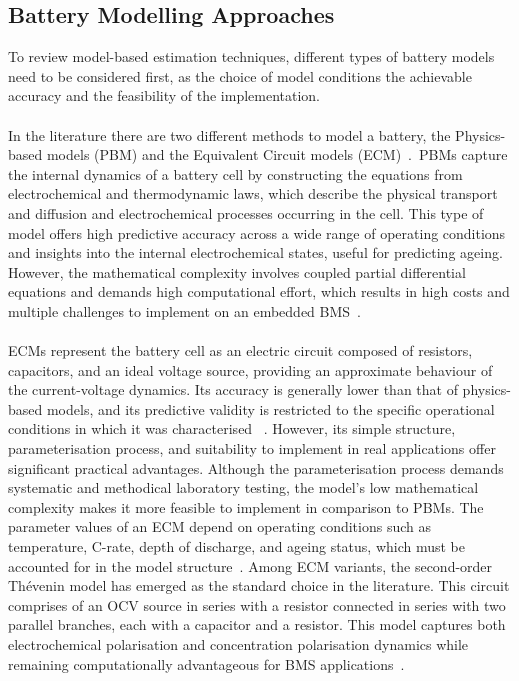 \subsection{Battery Modelling Approaches}\label{SoABatteryModels}

To review model-based estimation techniques, different types of battery models need to be considered first, 
as the choice of model conditions the achievable accuracy and the feasibility of the implementation.
\\
\\
In the literature there are two different methods to model a battery, the Physics-based models (\acs{PBM}) and the Equivalent 
Circuit models (\acs{ECM})~\cite{plett2015battery}.~\acsp{PBM} capture the internal dynamics of a battery cell by constructing the 
equations from electrochemical and thermodynamic laws, which describe the physical transport and diffusion and 
electrochemical processes occurring in the cell. This type of model offers high predictive accuracy across a wide 
range of operating conditions and insights into the internal electrochemical states, useful for predicting ageing. 
However, the mathematical complexity involves coupled partial differential equations and demands high computational
effort, which results in high costs and multiple challenges to implement on an embedded \acs{BMS}~\cite{plett2015battery}.
\\
\\
\acsp{ECM} represent the battery cell as an electric circuit composed of resistors, capacitors, and an ideal voltage source, providing
an approximate behaviour of the current-voltage dynamics. Its accuracy is generally lower than that of physics-based models, 
and its predictive validity is restricted to the specific operational conditions in which it was characterised~\cite{plett2015battery}
\cite{SOHBook}.
However, its simple structure, parameterisation process, and suitability to implement in real applications offer significant 
practical advantages. Although the parameterisation process demands systematic and methodical laboratory testing, 
the model's low mathematical complexity makes it more feasible to implement in comparison to \acsp{PBM}.
The parameter values of an \acs{ECM} depend on operating conditions such as temperature, C-rate, depth of discharge, 
and ageing status, which must be accounted for in the model structure~\cite{DEVARAKONDA2014}. Among \acs{ECM} variants, the second-order 
Thévenin model has emerged as the standard choice in the literature. This circuit comprises of an \acs{OCV} source in series with a 
resistor connected in series with two parallel branches, each with a capacitor and a resistor. 
This model captures both electrochemical polarisation and concentration polarisation dynamics while 
remaining computationally advantageous for \acs{BMS} applications~\cite{BatteryKalmanRaceCar}\cite{EKFEV}\cite{SOCSOH}.

